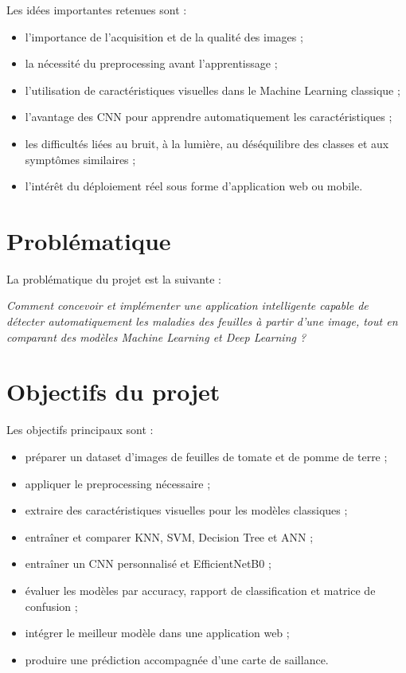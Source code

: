 \documentclass[12pt,a4paper]{report}
\begin{document}
Les idées importantes retenues sont :
\begin{itemize}
  \item l'importance de l'acquisition et de la qualité des images ;
  \item la nécessité du preprocessing avant l'apprentissage ;
  \item l'utilisation de caractéristiques visuelles dans le Machine Learning classique ;
  \item l'avantage des CNN pour apprendre automatiquement les caractéristiques ;
  \item les difficultés liées au bruit, à la lumière, au déséquilibre des classes et aux symptômes similaires ;
  \item l'intérêt du déploiement réel sous forme d'application web ou mobile.
\end{itemize}

\section{Problématique}
La problématique du projet est la suivante :

\begin{center}
\textit{Comment concevoir et implémenter une application intelligente capable de détecter automatiquement les maladies des feuilles à partir d'une image, tout en comparant des modèles Machine Learning et Deep Learning ?}
\end{center}

\section{Objectifs du projet}
Les objectifs principaux sont :
\begin{itemize}
  \item préparer un dataset d'images de feuilles de tomate et de pomme de terre ;
  \item appliquer le preprocessing nécessaire ;
  \item extraire des caractéristiques visuelles pour les modèles classiques ;
  \item entraîner et comparer KNN, SVM, Decision Tree et ANN ;
  \item entraîner un CNN personnalisé et EfficientNetB0 ;
  \item évaluer les modèles par accuracy, rapport de classification et matrice de confusion ;
  \item intégrer le meilleur modèle dans une application web ;
  \item produire une prédiction accompagnée d'une carte de saillance.
\end{itemize}
\end{document}
